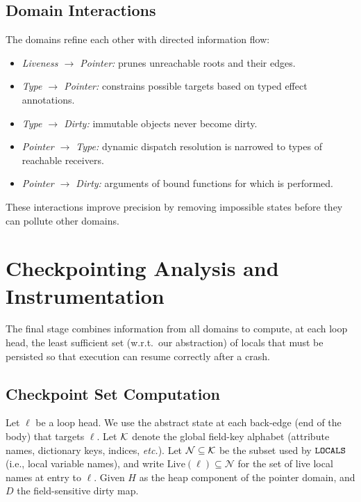 \egroup


\subsection{Domain Interactions}
The domains refine each other with directed information flow:
\begin{itemize}
    \item \emph{Liveness $\rightarrow$ Pointer:} prunes unreachable roots and their edges.
    \item \emph{Type $\rightarrow$ Pointer:} constrains possible targets based on typed effect annotations.
    \item \emph{Type $\rightarrow$ Dirty:} immutable objects never become dirty.
    \item \emph{Pointer $\rightarrow$ Type:} dynamic dispatch resolution is narrowed to types of reachable receivers.
    \item \emph{Pointer $\rightarrow$ Dirty:} arguments of bound functions for which \tupdate is performed.
\end{itemize}
These interactions improve precision by removing impossible states before they can pollute other domains.



\section{Checkpointing Analysis and Instrumentation}
\label{sec:checkpoint-analysis}

The final stage combines information from all domains to compute, at each loop head, the least sufficient set (w.r.t.\ our abstraction) of locals that must be persisted so that execution can resume correctly after a crash.

\subsection{Checkpoint Set Computation}

Let $\ell$ be a loop head. We use the abstract state at each back-edge (end of the body) that targets $\ell$.
Let $\mathcal{K}$ denote the global field-key alphabet (attribute names, dictionary keys, indices, \emph{etc.}).
Let $\mathcal{N}\subseteq\mathcal{K}$ be the subset used by $\texttt{LOCALS}$ (i.e., local variable names), and write $\text{Live}(\ell)\subseteq\mathcal{N}$ for the set of live local names at entry to $\ell$.
Given $H$ as the heap component of the pointer domain, and $D$ the field-sensitive dirty map.

